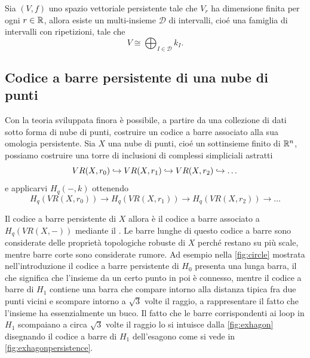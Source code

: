 \begin{theorem}\label{thm:persistentdecomposition}
  Sia $(V,f)$ uno spazio vettoriale persistente tale che $V_r$ ha dimensione finita per ogni $r\in\mathbb{R}$, allora esiste un
  multi-insieme $\mathcal{D}$ di intervalli, cioé una famiglia di intervalli con ripetizioni, tale che
  \begin{equation*}
    V\cong \bigoplus_{I\in\mathcal{D}} k_I.
  \end{equation*}
\end{theorem}

\subsection{Codice a barre persistente di una nube di punti}

Con la teoria sviluppata finora è possibile, a partire da una collezione di dati sotto forma di nube di punti, costruire un codice a barre associato alla sua omologia persistente. Sia $X$ una nube di punti, cioé un sottinsieme finito di $\mathbb{R}^n$, possiamo costruire una torre di inclusioni di complessi simpliciali astratti
\begin{equation*}
  VR(X,r_0)\hookrightarrow VR(X,r_1)\hookrightarrow VR(X,r_2)\hookrightarrow \dots
\end{equation*}
e applicarvi $H_q(-,k)$ ottenendo
\begin{equation*}
  H_q(VR(X,r_0))\to H_q(VR(X,r_1))\to H_q(VR(X,r_2))\to \dots
\end{equation*}

Il codice a barre persistente di $X$ allora è il codice a barre associato a $H_q(VR(X,-))$ mediante il . Le barre lunghe di questo codice a barre sono considerate delle proprietà topologiche robuste di $X$ perché restano su più scale, mentre barre corte sono considerate rumore. Ad esempio nella \cref{fig:circle} mostrata nell'introduzione il codice a barre persistente di $H_0$ presenta una lunga barra, il che significa che l'insieme da un certo punto in poi è connesso, mentre il codice a barre di $H_1$ contiene una barra che compare intorno alla distanza tipica fra due punti vicini e scompare intorno a $\sqrt{3}$ volte il raggio, a rappresentare il fatto che l'insieme ha essenzialmente un buco. Il fatto che le barre corrispondenti ai loop in $H_1$ scompaiano a circa $\sqrt{3}$ volte il raggio lo si intuisce dalla \cref{fig:exhagon} disegnando il codice a barre di $H_1$ dell'esagono come si vede in \cref{fig:exhagonpersistence}.

